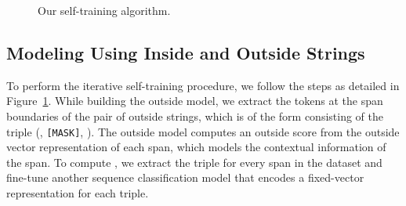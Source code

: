 \documentclass[11pt]{article}
\begin{document}
\begin{figure}[t]
\centering
\begin{small}
\end{small}
\caption[Our self-training algorithm]{Our self-training algorithm.}
\label{fig:our-self-training-algo}
\end{figure} 
\subsection{Modeling Using Inside and Outside Strings}
\label{ssec:inside-outside-algorithm}
 To perform the iterative self-training procedure, we follow the steps as detailed in Figure~\ref{fig:our-self-training-algo}. While building the outside model, we extract the tokens at the span boundaries of the pair of outside strings, which is of the form consisting of the triple (, \texttt{[MASK]}, ). The outside model computes an outside score  from the outside vector representation  of each span, which models the contextual information of the span. To compute , we extract the triple for every span  in the dataset and fine-tune another sequence classification model that encodes a fixed-vector representation for each triple.
\end{document}
